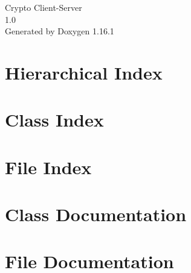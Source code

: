 \documentclass[twoside]{book}
\newcommand{\+}{\discretionary{\mbox{\scriptsize$\hookleftarrow$}}{}{}}
\newcommand{\clearemptydoublepage}{%
    \newpage{\pagestyle{empty}\cleardoublepage}%
  }
\begin{document}
  \raggedbottom
    \hypersetup{pageanchor=false,
                bookmarksnumbered=true,
                pdfencoding=unicode
               }
  \begin{titlepage}
  \vspace*{7cm}
  \begin{center}%
  {\Large Crypto Client-\/\+Server}\\
  [1ex]\large 1.\+0 \\
  \vspace*{1cm}
  {\large Generated by Doxygen 1.16.1}\\
  \end{center}
  \end{titlepage}
  \clearemptydoublepage
  \tableofcontents
  \clearemptydoublepage
  \hypersetup{pageanchor=true}
\chapter{Hierarchical Index}

\chapter{Class Index}

\chapter{File Index}

\chapter{Class Documentation}







\chapter{File Documentation}










  \backmatter
  \newpage
  \clearemptydoublepage
  \printindex
\end{document}
